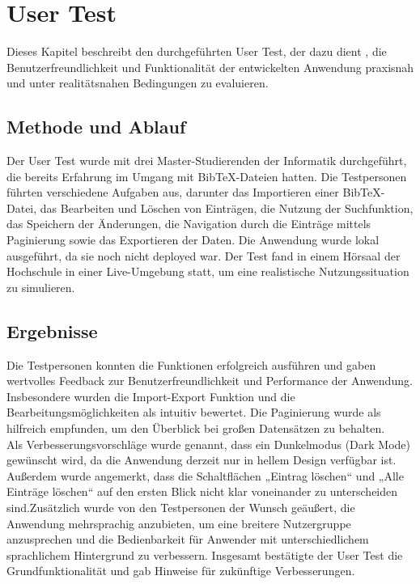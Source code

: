 \chapter{User Test}
Dieses Kapitel beschreibt den durchgeführten User Test, der dazu dient ,
die Benutzerfreundlichkeit und Funktionalität der entwickelten Anwendung praxisnah und unter
realitätsnahen Bedingungen zu evaluieren.

\section{Methode und Ablauf}
Der User Test wurde mit drei Master-Studierenden der Informatik durchgeführt, 
die bereits Erfahrung im Umgang mit BibTeX-Dateien hatten. Die Testpersonen führten verschiedene Aufgaben aus,
darunter das Importieren einer BibTeX-Datei, das Bearbeiten und Löschen von Einträgen,
die Nutzung der Suchfunktion, das Speichern der Änderungen, die Navigation  durch die Einträge mittels Paginierung 
sowie das Exportieren der Daten. Die Anwendung wurde lokal ausgeführt, da sie noch nicht deployed war. Der Test fand in einem Hörsaal
der Hochschule in einer Live-Umgebung statt, um eine realistische Nutzungssituation zu simulieren.

\section{Ergebnisse}
Die Testpersonen konnten die Funktionen erfolgreich ausführen und gaben wertvolles Feedback zur
Benutzerfreundlichkeit und Performance der Anwendung. Insbesondere wurden die Import-Export Funktion und
die Bearbeitungsmöglichkeiten als intuitiv bewertet. Die Paginierung wurde als hilfreich empfunden, um den 
Überblick bei großen Datensätzen zu behalten.\\

\noindent Als Verbesserungsvorschläge wurde genannt, dass ein Dunkelmodus (Dark Mode) gewünscht wird, 
da die Anwendung derzeit nur in hellem Design verfügbar ist. Außerdem wurde angemerkt, 
dass die Schaltflächen „Eintrag löschen“ und „Alle Einträge löschen“ auf den ersten Blick nicht klar voneinander 
zu unterscheiden sind.Zusätzlich wurde von den Testpersonen der Wunsch geäußert, die Anwendung mehrsprachig anzubieten,
um eine breitere Nutzergruppe anzusprechen und die Bedienbarkeit für Anwender mit unterschiedlichem sprachlichem Hintergrund
zu verbessern. Insgesamt bestätigte der User Test die Grundfunktionalität und gab Hinweise für zukünftige Verbesserungen.


